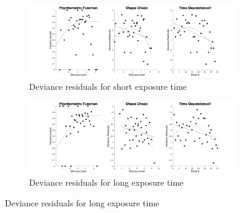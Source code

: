 \documentclass{article}
\begin{document}
\begin{figure}[!hb]
    \begin{subfigure}{\textwidth}
        \centering
        \includegraphics[width = \linewidth]{Thesis/plots/gof/segDist/segDist_da_short_deviance.png}
        \caption{Deviance residuals for short exposure time}
    \end{subfigure}
    \begin{subfigure}{\textwidth}
        \centering
        \includegraphics[width = \linewidth]{Thesis/plots/gof/segDist/segDist_da_long_deviance.png}
        \caption{Deviance residuals for long exposure time}
    \end{subfigure}
\end{figure}

\clearpage
\end{document}
